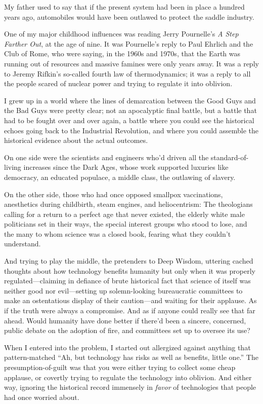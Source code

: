 {
 My father used to say that if the present system had been in place
a hundred years ago, automobiles would have been outlawed to protect
the saddle industry. }

{
 One of my major childhood influences was reading Jerry
Pournelle's \textit{A Step Farther Out}, at the age of
nine. It was Pournelle's reply to Paul Ehrlich and the
Club of Rome, who were saying, in the 1960s and 1970s, that the Earth
was running out of resources and massive famines were only years away.
It was a reply to Jeremy Rifkin's so-called fourth law
of thermodynamics; it was a reply to all the people scared of nuclear
power and trying to regulate it into oblivion.}

{
 I grew up in a world where the lines of demarcation between the
Good Guys and the Bad Guys were pretty clear; not an apocalyptic final
battle, but a battle that had to be fought over and over again, a
battle where you could see the historical echoes going back to the
Industrial Revolution, and where you could assemble the historical
evidence about the actual outcomes.}

{
 On one side were the scientists and engineers
who'd driven all the standard-of-living increases since
the Dark Ages, whose work supported luxuries like democracy, an
educated populace, a middle class, the outlawing of slavery.}

{
 On the other side, those who had once opposed smallpox
vaccinations, anesthetics during childbirth, steam engines, and
heliocentrism: The theologians calling for a return to a perfect age
that never existed, the elderly white male politicians set in their
ways, the special interest groups who stood to lose, and the many to
whom science was a closed book, fearing what they
couldn't understand.}

{
 And trying to play the middle, the pretenders to Deep Wisdom,
uttering cached thoughts about how technology benefits humanity but
only when it was properly regulated---claiming in defiance of brute
historical fact that science of itself was neither good nor
evil---setting up solemn-looking bureaucratic committees to make an
ostentatious display of their caution---and waiting for their applause.
As if the truth were always a compromise. And as if anyone could really
see that far ahead. Would humanity have done better if
there'd been a sincere, concerned, public debate on the
adoption of fire, and committees set up to oversee its use?}

{
 When I entered into the problem, I started out allergized against
anything that pattern-matched ``Ah, but technology has
risks as well as benefits, little one.'' The
presumption-of-guilt was that you were either trying to collect some
cheap applause, or covertly trying to regulate the technology into
oblivion. And either way, ignoring the historical record immensely in
\textit{favor} of technologies that people had once worried about.}

